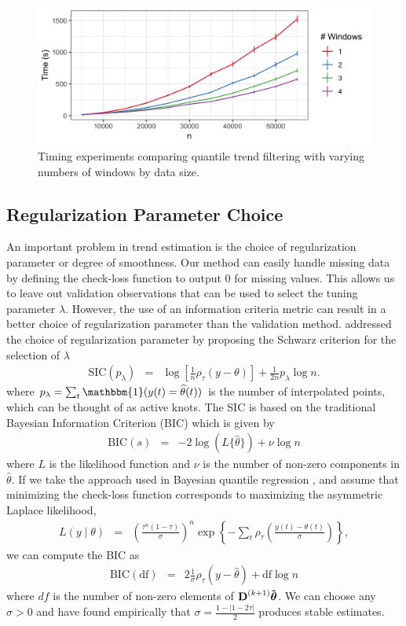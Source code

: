 \documentclass[12pt]{article}
\newcommand{\One}{\mathbbm{1}}
\newcommand{\Vhat}[1]{{\bm{\hat \mathbf{\MakeLowercase{#1}}}}} %
\newcommand{\M}[1]{{\bm{\mathbf{\MakeUppercase{#1}}}}} %
\newcommand{\Mn}[2]{\M{#1}^{(#2)}} %
\begin{document}
	\begin{figure}[!h] 
		\centering
		\includegraphics[width = 0.7\linewidth]{Figures/Fig_timing_experiment.png}
		\caption{Timing experiments comparing quantile trend filtering with varying numbers of windows by data size.}
		\label{fig:timing}
	\end{figure}

	\subsection{Regularization Parameter Choice}
	\label{sec:lambda_choice}
	An important problem in trend estimation is the choice of regularization parameter or degree of smoothness. Our method can easily handle missing data by defining the check-loss function to output 0 for missing values. This allows us to leave out validation observations that can be used to select the tuning parameter $\lambda$. However, the use of an information criteria metric can result in a better choice of regularization parameter than the validation method.  \cite{KoenkerNgPortnoy1994} addressed the choice of regularization parameter by proposing the Schwarz criterion for the selection of $\lambda$
	\begin{eqnarray*}
	\label{eq:SIC}
	\mbox{SIC}(p_{\lambda}) & = & \log\left[\frac{1}{n}\rho_{\tau}(y - \theta)\right] + \frac{1}{2n}p_{\lambda}\log n.
	\end{eqnarray*}
	where $p_{\lambda} = \sum_t \One(y(t) = \widehat{\theta}(t))$ is the number of interpolated points, which can be thought of as active knots. The SIC is based on the traditional Bayesian Information Criterion (BIC) which is given by 
	\begin{eqnarray*}
	\mbox{BIC}(s) & = & -2\log(L\{\hat{\theta}\}) + \nu\log n 
	\end{eqnarray*}	
	where $L$ is the likelihood function and $\nu$ is the number of non-zero components in $\hat{\theta}$. If we take the approach used in Bayesian quantile regression \citep{yu2001bayesian}, and assume that minimizing the check-loss function corresponds to maximizing the asymmetric Laplace likelihood, 
	\begin{eqnarray*}
	L(y \mid \theta) & = & \left(\frac{\tau^n(1-\tau)}{\sigma}\right)^n\exp\left\{-\sum_t\rho_\tau\left(\frac{y(t) - \theta(t)}{\sigma}\right)\right\},
	\end{eqnarray*} 
	we can compute the BIC as 
	\begin{eqnarray*}
	\mbox{BIC}(\mbox{df}) & = & 2\frac{1}{\sigma}\rho_{\tau}(y-\hat{\theta}) + \mbox{df}\log n
	\end{eqnarray*} 
	where $df$ is the number of non-zero elements of $\Mn{D}{k+1}\Vhat{\theta}$. We can choose any $\sigma>0$ and have found empirically that $\sigma =  \frac{1-\lvert 1-2\tau\rvert}{2}$ produces stable estimates. 
	
\end{document}
